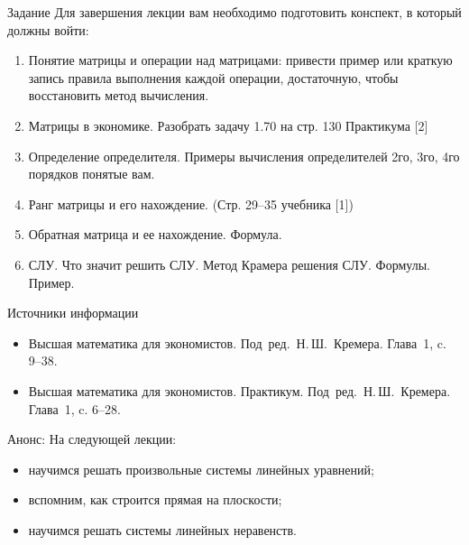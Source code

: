 \documentclass[unicode,11pt,notheorems]{beamer}
\begin{document}
\begin{frame}{Задание}
Для завершения лекции вам необходимо подготовить конспект, в который должны войти:
	\begin{enumerate}
		\item 
			Понятие матрицы и операции над матрицами: привести пример или краткую запись правила выполнения каждой операции, достаточную, чтобы восстановить метод вычисления.
		\item 
			Матрицы в экономике. Разобрать задачу 1.70 на стр. 130 Практикума [2]
		\item 
			Определение определителя. 
			Примеры вычисления определителей 2го, 3го, 4го порядков понятые вам. 
		\item 
			Ранг матрицы и его нахождение. (Стр. 29--35 учебника [1])
		\item 
			Обратная матрица и ее нахождение. Формула.
		\item 
			СЛУ. Что значит решить СЛУ. Метод Крамера решения СЛУ. Формулы. Пример.
	\end{enumerate}
\end{frame}
\begin{frame}{Источники информации}
\begin{itemize}
\item 
	Высшая математика для экономистов. Под~ред.~Н.\,Ш.~Кремера. Глава~1, c. 9--38.
\item 
	Высшая математика для экономистов. Практикум. Под~ред.~Н.\,Ш.~Кремера. Глава~1, c. 6--28.
\end{itemize}

\end{frame}

\begin{frame}{Анонс:}
	На следующей лекции:
	\begin{itemize}
	\item 
		научимся решать произвольные системы линейных уравнений;
	\item 
		вспомним, как строится прямая на плоскости;
	\item 
		научимся решать системы линейных неравенств.
	\end{itemize}

\end{frame}
\end{document}
